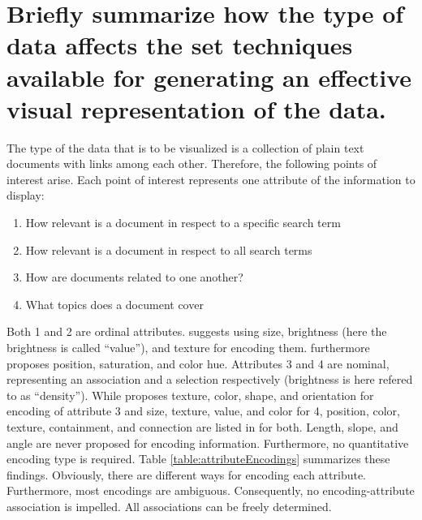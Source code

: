 \section{Briefly summarize how the type of data affects the set techniques available for generating an effective visual representation of the data.}

The type of the data that is to be visualized is a collection of plain text documents with links among each other. Therefore, the following points of interest arise. Each point of interest represents one attribute of the information to display:
\begin{enumerate}
	\item How relevant is a document in respect to a specific search term
	\item How relevant is a document in respect to all search terms
	\item How are documents related to one another?
	\item What topics does a document cover
\end{enumerate}
Both 1 and 2 are ordinal attributes. \cite{Bertin1967} suggests using size, brightness (here the brightness is called ``value''), and texture for encoding them. \cite{Mackinlay2086} furthermore proposes position, saturation, and color hue. Attributes 3 and 4 are nominal, representing an association and a selection respectively (brightness is here refered to as ``density''). While \cite{Bertin1967} proposes texture, color, shape, and orientation for encoding of attribute 3 and size, texture, value, and color for 4, position, color, texture, containment, and connection are listed in \cite{Mackinlay2086} for both. Length, slope, and angle are never proposed for encoding information. Furthermore, no quantitative encoding type is required. Table \ref{table:attributeEncodings} summarizes these findings. Obviously, there are different ways for encoding each attribute. Furthermore, most encodings are ambiguous. Consequently, no encoding-attribute association is impelled. All associations can be freely determined.
